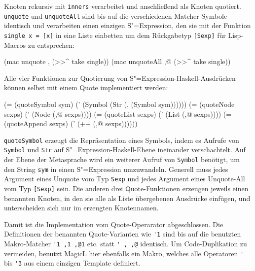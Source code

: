 \documentclass[11pt, a4paper, bibgerm]{scrbook}
\newenvironment{DIFnomarkup}{}{}
\newcommand\icode[1]{\lstinline?#1?}
\newcommand{\sexp}{S"=Expression}
\begin{document}
Knoten rekursiv mit \icode{inners} verarbeitet und anschließend als
Knoten quotiert. \icode{unquote} und \icode{unquoteAll} sind bis auf die
verschiedenen Matcher-Symbole identisch und verarbeiten einen einzigen
\sexp{}, den sie mit der Funktion \icode{single x = [x]} in eine Liste
einbetten um dem Rückgabetyp \icode{[Sexp]} für Lisp-Macros zu
entsprechen:
\begin{DIFnomarkup}\begin{code}
    (mac unquote    ,  (>>^ take single))
    (mac unquoteAll ,@ (>>^ take single))
\end{code}\end{DIFnomarkup}
Alle vier Funktionen zur Quotierung von \sexp{}-Haskell-Ausdrücken
können selbst mit einem Quote implementiert werden:
\begin{DIFnomarkup}\begin{code}
    (= (quoteSymbol sym)
       (' (Symbol (Str (, (Symbol sym))))))
    (= (quoteNode sexps)
       (' (Node (,@ sexps))))
    (= (quoteList sexps)
       (' (List (,@ sexps))))
    (= (quoteAppend sexps)
       (' (++ (,@ sexps))))))
\end{code}\end{DIFnomarkup}
\icode{quoteSymbol} erzeugt die Repräsentation eines Symbols, indem es
Aufrufe von \icode{Symbol} und \icode{Str} auf \sexp{}-Haskell-Ebene
ineinander verschachtelt. Auf der Ebene der Metasprache wird ein
weiterer Aufruf von \icode{Symbol} benötigt, um den String \icode{sym}
in einen \sexp{} umzuwandeln. Generell muss jedes Argument eines Unquote
vom Typ \icode{Sexp} und jedes Argument eines Unquote-All vom Typ
\icode{[Sexp]} sein. Die anderen drei Quote-Funktionen erzeugen jeweils
einen benannten Knoten, in den sie alle als Liste übergebenen Ausdrücke
einfügen, und unterscheiden sich nur im erzeugten Knotennamen.

Damit ist die Implementation vom Quote-Operarator abgeschlossen. Die
Definitionen der benannten Quote-Varianten wie \icode{'1} sind bis auf
die benutzten Makro-Matcher \icode{'1 ,1 ,@1} etc. statt \icode{' , ,@}
identisch. Um Code-Duplikation zu vermeiden, benutzt MagicL hier
ebenfalls ein Makro, welches alle Operatoren \icode{'}
bis \icode{'3} aus einem einzigen Template definiert.
\end{document}
